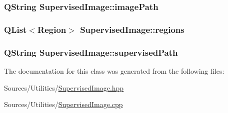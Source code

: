 \hypertarget{class_supervised_image_a39f8b0212d2dae489d7b060b0d8dd1b9}{
\subsubsection[{image\+Path}]{\setlength{\rightskip}{0pt plus 5cm}Q\+String Supervised\+Image\+::image\+Path\hspace{0.3cm}{\ttfamily [private]}}}\label{class_supervised_image_a39f8b0212d2dae489d7b060b0d8dd1b9}
\hypertarget{class_supervised_image_a2113ab863b2253b37dab1d7b575e8b10}{
\subsubsection[{regions}]{\setlength{\rightskip}{0pt plus 5cm}Q\+List$<${\bf Region}$>$ Supervised\+Image\+::regions\hspace{0.3cm}{\ttfamily [private]}}}\label{class_supervised_image_a2113ab863b2253b37dab1d7b575e8b10}
\hypertarget{class_supervised_image_aeeb634f3804dffba600e6aea71fc353e}{
\subsubsection[{supervised\+Path}]{\setlength{\rightskip}{0pt plus 5cm}Q\+String Supervised\+Image\+::supervised\+Path\hspace{0.3cm}{\ttfamily [private]}}}\label{class_supervised_image_aeeb634f3804dffba600e6aea71fc353e}


The documentation for this class was generated from the following files\+:\begin{DoxyCompactItemize}
\item 
Sources/\+Utilities/\hyperlink{_supervised_image_8hpp}{Supervised\+Image.\+hpp}\item 
Sources/\+Utilities/\hyperlink{_supervised_image_8cpp}{Supervised\+Image.\+cpp}\end{DoxyCompactItemize}
